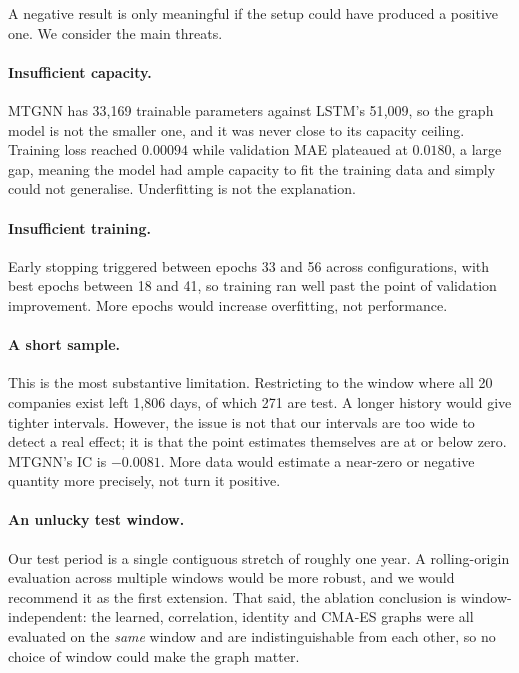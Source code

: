 A negative result is only meaningful if the setup could have produced a positive one. We consider the main threats.

\paragraph{Insufficient capacity.} MTGNN has 33{,}169 trainable parameters against LSTM's 51{,}009, so the graph model is not the smaller one, and it was never close to its capacity ceiling. Training loss reached $0.00094$ while validation MAE plateaued at $0.0180$, a large gap, meaning the model had ample capacity to fit the training data and simply could not generalise. Underfitting is not the explanation.

\paragraph{Insufficient training.} Early stopping triggered between epochs 33 and 56 across configurations, with best epochs between 18 and 41, so training ran well past the point of validation improvement. More epochs would increase overfitting, not performance.

\paragraph{A short sample.} This is the most substantive limitation. Restricting to the window where all 20 companies exist left 1{,}806 days, of which 271 are test. A longer history would give tighter intervals. However, the issue is not that our intervals are too wide to detect a real effect; it is that the point estimates themselves are at or below zero. MTGNN's IC is $-0.0081$. More data would estimate a near-zero or negative quantity more precisely, not turn it positive.

\paragraph{An unlucky test window.} Our test period is a single contiguous stretch of roughly one year. A rolling-origin evaluation across multiple windows would be more robust, and we would recommend it as the first extension. That said, the ablation conclusion is window-independent: the learned, correlation, identity and CMA-ES graphs were all evaluated on the \emph{same} window and are indistinguishable from each other, so no choice of window could make the graph matter.

